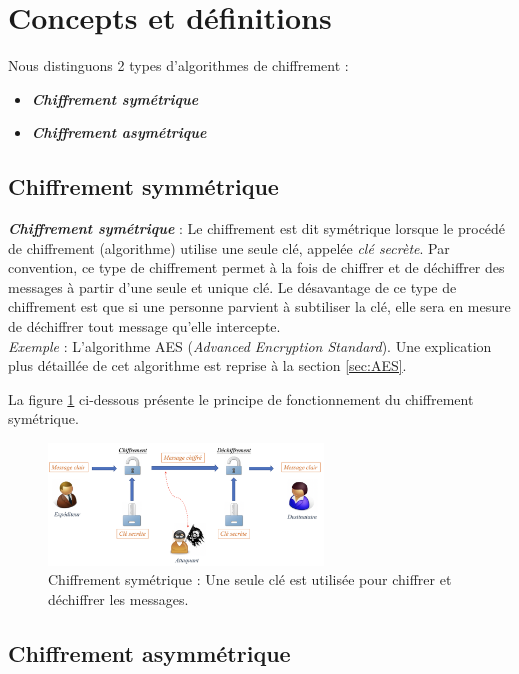 \documentclass[oneside]{book}
\begin{document}
\section{Concepts et définitions}
\label{sec:Concepts}

Nous distinguons 2 types d'algorithmes de chiffrement : 
\begin{itemize}
\item \textbf{\textit{Chiffrement symétrique}}
\item \textbf{\textit{Chiffrement asymétrique}}
\end{itemize}

\subsection{Chiffrement symmétrique}
\label{subsec:Chiffrement symmétrique}

\textbf{\textit{Chiffrement symétrique}} : Le chiffrement est dit symétrique lorsque le procédé de chiffrement (algorithme) utilise une seule clé, appelée \textit{clé secrète}. Par convention, ce type de chiffrement permet à la fois de chiffrer et de déchiffrer des messages à partir d'une seule et unique clé. Le désavantage de ce type de chiffrement est que si une personne parvient à subtiliser la clé, elle sera en mesure de déchiffrer tout message qu'elle intercepte.  \\
\textit{Exemple} : L'algorithme AES (\textit{Advanced Encryption Standard}). Une explication plus détaillée de cet algorithme est reprise à la section \ref{sec:AES}.

La figure \ref{fig:symétrique} ci-dessous présente le principe de fonctionnement du chiffrement symétrique.

\begin{figure}[htbp]
    \centering
    \includegraphics[width=0.65\textwidth]{image/symetrique}
    \caption{Chiffrement symétrique : Une seule clé est utilisée pour chiffrer et déchiffrer les messages.}
    \label{fig:symétrique}
\end{figure}


\subsection{Chiffrement asymmétrique}
\label{subsec:Chiffrement asymmétrique}
\end{document}

